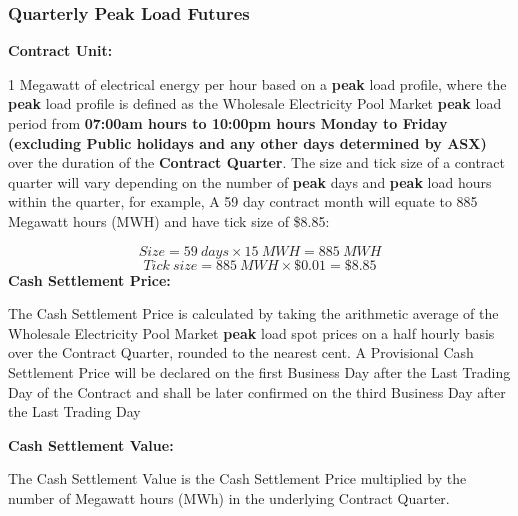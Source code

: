 \documentclass[12pt]{article}
\begin{document}
\subsubsection{Quarterly Peak Load Futures}
\begin{flushleft}
\textbf{Contract Unit:}\par
1 Megawatt of electrical energy per hour based on a \textbf{peak} load profile, where the \textbf{peak} load profile is defined as the Wholesale Electricity Pool Market \textbf{peak} load period from \textbf{ 07:00am hours to
10:00pm hours Monday to Friday (excluding Public holidays and any other days determined by ASX)} over the duration of the \textbf{Contract Quarter}. The size and tick size of a contract quarter will vary depending on the number of \textbf{peak} days and \textbf{peak} load hours within the quarter, for example, 
A 59 day contract month will equate to 885 Megawatt hours (MWH) and have tick size of \$8.85:\par
    $$ Size = 59 \ days \times 15 \ MWH = 885 \ MWH $$
   $$ Tick\ size = 885 \ MWH \times \$0.01 = \$8.85 $$
\frameboxend
\textbf{Cash Settlement Price:}\par
The Cash Settlement Price is calculated by taking the arithmetic
average of the Wholesale Electricity Pool Market \textbf{peak} load spot prices on a half hourly basis over the Contract Quarter, rounded to the nearest cent. A Provisional Cash Settlement Price will be declared on the first Business Day after the Last Trading Day of the Contract and shall be later confirmed on the third Business Day after the Last Trading Day\par
\textbf{Cash Settlement Value:}\par
The Cash Settlement Value is the Cash Settlement Price multiplied by the number of Megawatt hours (MWh) in the underlying Contract
Quarter.
\end{flushleft}
\end{document}
